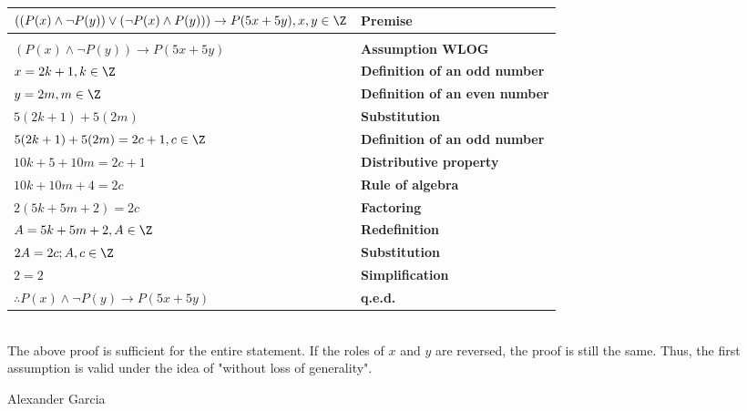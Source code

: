 \documentclass[]{article}
\def\OR{\vee}
\def\AND{\wedge}
\def\imp{\rightarrow}
\begin{document}
\begin{tabular}{l l}

	$( (P(x) \AND \neg P(y)) \OR (\neg P(x) \AND P(y)) ) \imp P(5x + 5y), x, y \in \Z$ & \textbf{Premise} \\

	\hline \\

	$(P(x) \AND \neg P(y)) \imp P(5x + 5y)$ & \textbf{Assumption WLOG} \\

	$x = 2k + 1, k \in \Z$ & \textbf{Definition of an odd number} \\

	$y = 2m, m \in \Z$ & \textbf{Definition of an even number} \\

	$5(2k + 1) + 5(2m)$ & \textbf{Substitution} \\

	$5(2k + 1) + 5(2m) = 2c + 1, c \in \Z$ & \textbf{Definition of an odd number} \\

	$10k + 5 + 10m = 2c + 1$ & \textbf{Distributive property} \\

	$10k + 10m + 4 = 2c$ & \textbf{Rule of algebra} \\

	$2(5k + 5m + 2) = 2c$ & \textbf{Factoring} \\

	$A = 5k + 5m + 2, A \in \Z$ & \textbf{Redefinition} \\
	
	$2A = 2c; A, c \in \Z$ & \textbf{Substitution} \\

	$2 = 2$ & \textbf{Simplification} \\

	$\therefore P(x) \AND \neg P(y) \imp P(5x + 5y)$ & \textbf{q.e.d.} \\

\end{tabular} \\

The above proof is sufficient for the entire statement. If the roles of $x$ and $y$ are reversed, the proof is still the same. Thus, the first assumption is valid under the idea of "without loss of generality".

\newpage

Alexander Garcia \\
\end{document}
